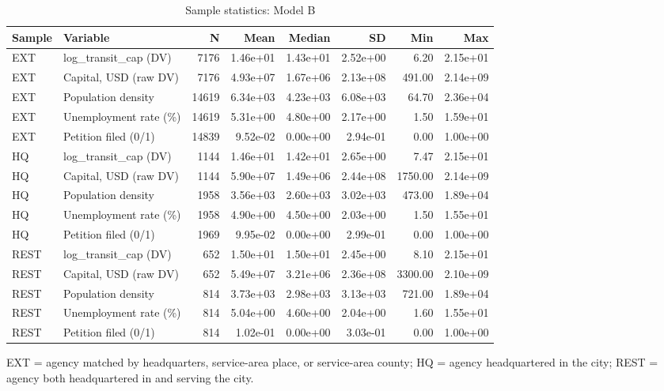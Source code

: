 \begin{table}

\caption{\label{tab:tab-sample-stats}Sample statistics: Model B}
\centering
\begin{threeparttable}
\begin{tabular}[t]{llrrrrrr}
\toprule
Sample & Variable & N & Mean & Median & SD & Min & Max\\
\midrule
EXT & log\_transit\_cap (DV) & 7176 & 1.46e+01 & 1.43e+01 & 2.52e+00 & 6.20 & 2.15e+01\\
EXT & Capital, USD (raw DV) & 7176 & 4.93e+07 & 1.67e+06 & 2.13e+08 & 491.00 & 2.14e+09\\
EXT & Population density & 14619 & 6.34e+03 & 4.23e+03 & 6.08e+03 & 64.70 & 2.36e+04\\
EXT & Unemployment rate (\%) & 14619 & 5.31e+00 & 4.80e+00 & 2.17e+00 & 1.50 & 1.59e+01\\
EXT & Petition filed (0/1) & 14839 & 9.52e-02 & 0.00e+00 & 2.94e-01 & 0.00 & 1.00e+00\\
\addlinespace
HQ & log\_transit\_cap (DV) & 1144 & 1.46e+01 & 1.42e+01 & 2.65e+00 & 7.47 & 2.15e+01\\
HQ & Capital, USD (raw DV) & 1144 & 5.90e+07 & 1.49e+06 & 2.44e+08 & 1750.00 & 2.14e+09\\
HQ & Population density & 1958 & 3.56e+03 & 2.60e+03 & 3.02e+03 & 473.00 & 1.89e+04\\
HQ & Unemployment rate (\%) & 1958 & 4.90e+00 & 4.50e+00 & 2.03e+00 & 1.50 & 1.55e+01\\
HQ & Petition filed (0/1) & 1969 & 9.95e-02 & 0.00e+00 & 2.99e-01 & 0.00 & 1.00e+00\\
\addlinespace
REST & log\_transit\_cap (DV) & 652 & 1.50e+01 & 1.50e+01 & 2.45e+00 & 8.10 & 2.15e+01\\
REST & Capital, USD (raw DV) & 652 & 5.49e+07 & 3.21e+06 & 2.36e+08 & 3300.00 & 2.10e+09\\
REST & Population density & 814 & 3.73e+03 & 2.98e+03 & 3.13e+03 & 721.00 & 1.89e+04\\
REST & Unemployment rate (\%) & 814 & 5.04e+00 & 4.60e+00 & 2.04e+00 & 1.60 & 1.55e+01\\
REST & Petition filed (0/1) & 814 & 1.02e-01 & 0.00e+00 & 3.03e-01 & 0.00 & 1.00e+00\\
\bottomrule
\end{tabular}
\begin{tablenotes}[para]
\item EXT = agency matched by headquarters, service-area place, or service-area county; HQ = agency headquartered in the city; REST = agency both headquartered in and serving the city.
\end{tablenotes}
\end{threeparttable}
\end{table}
